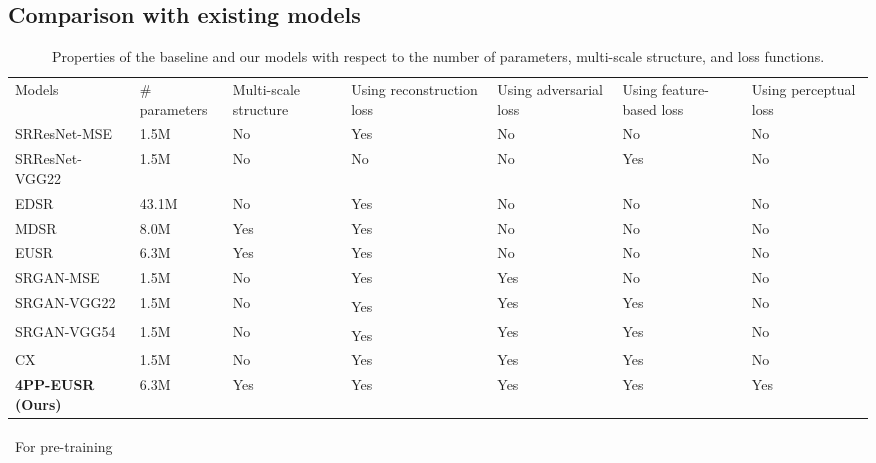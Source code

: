 \documentclass[runningheads]{llncs}
\begin{document}
\subsection{Comparison with existing models}

\begin{table*}[t]
	\scriptsize
	\centering
	\caption{Properties of the baseline and our models with respect to the number of parameters, multi-scale structure, and loss functions.}
	\label{table:baseline_properties}
	\begin{tabular}{l C{1.3cm} C{1.3cm} C{1.3cm} C{1.3cm} C{1.3cm} C{1.3cm}}
		\\
		Models & \# parameters & Multi-scale structure & Using reconstruction loss & Using adversarial loss & Using feature-based loss & Using perceptual loss \\
		\noalign{\smallskip}
		\hline
		\noalign{\smallskip}
		SRResNet-MSE & 1.5M & No & Yes & No & No & No \\
		SRResNet-VGG22 & 1.5M & No & No & No & Yes & No \\
		EDSR & 43.1M & No & Yes & No & No & No \\
		MDSR & 8.0M & Yes & Yes & No & No & No \\
		EUSR & 6.3M & Yes & Yes & No & No & No \\
		SRGAN-MSE & 1.5M & No & Yes & Yes & No & No \\
		SRGAN-VGG22 & 1.5M & No & Yes\textsuperscript{\dag} & Yes & Yes & No \\
		SRGAN-VGG54 & 1.5M & No & Yes\textsuperscript{\dag} & Yes & Yes & No \\
		CX & 1.5M & No & Yes & Yes & Yes & No \\
		\textbf{4PP-EUSR (Ours)} & 6.3M & Yes & Yes & Yes & Yes & Yes
	\end{tabular}
	\begin{tablenotes}
		\item \textsuperscript{\dag}~For pre-training
	\end{tablenotes}
\end{table*}
\end{document}
